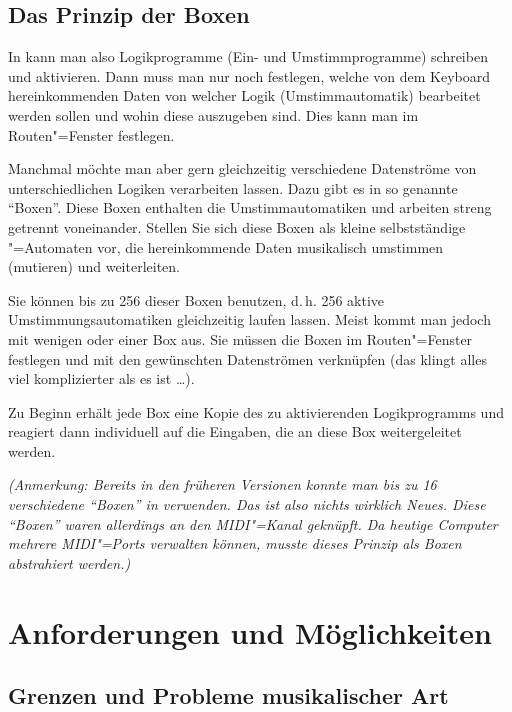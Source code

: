 \section{Das Prinzip der Boxen}\label{sec:CO_BOX}

In \mutabor{} kann man also Logikprogramme (Ein- und Umstimmprogramme)
schreiben und aktivieren. Dann muss man nur noch festlegen, welche von
dem Keyboard hereinkommenden Daten von welcher Logik
(Umstimmautomatik) bearbeitet werden sollen und wohin diese auszugeben
sind. Dies kann man im Routen"=Fenster festlegen.


Manchmal möchte man aber gern gleichzeitig verschiedene Datenströme
von unterschiedlichen Logiken verarbeiten lassen. Dazu gibt es in
\mutabor[~3] so genannte "`Boxen"'. Diese Boxen enthalten die
Umstimmautomatiken und arbeiten streng getrennt voneinander. Stellen
Sie sich diese Boxen als kleine selbstständige \mutabor{}"=Automaten
vor, die hereinkommende Daten musikalisch umstimmen (mutieren) und
weiterleiten.


Sie können bis zu 256 dieser Boxen benutzen, d.\,h. 256 aktive 
Umstimmungsautomatiken gleichzeitig laufen lassen. Meist kommt 
man jedoch mit wenigen oder einer Box aus. Sie müssen die Boxen 
im Routen"=Fenster festlegen und mit den gewünschten Datenströmen 
verknüpfen (das klingt alles viel komplizierter als es ist 
\dots ). 

Zu Beginn erhält jede Box eine Kopie des zu aktivierenden
Logikprogramms und reagiert dann individuell auf die Eingaben, die an
diese Box weitergeleitet werden.

\textit{(Anmerkung: Bereits in den früheren Versionen konnte man 
bis zu 16 verschiedene "`Boxen"' in \mutabor{} verwenden. Das ist 
also nichts wirklich Neues. Diese "`Boxen"' waren allerdings an 
den MIDI"=Kanal geknüpft. Da heutige Computer mehrere MIDI"=Ports 
verwalten können, musste dieses Prinzip als Boxen abstrahiert 
werden.)}

\chapter{Anforderungen und Möglichkeiten}
\section{Grenzen und Probleme musikalischer Art}


